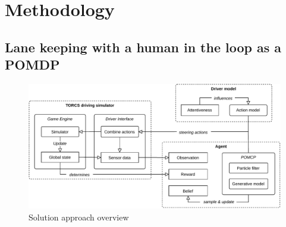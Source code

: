 \chapter{Methodology}
\label{sec:problem}



\section{Lane keeping with a human in the loop as a POMDP}
\label{sec:lane_keeping_loop}

\begin{figure}[ht]
    \centerfloat
    \includegraphics[width=1.2\linewidth]{figures/Components.pdf}
    \caption{Solution approach overview}
    \label{fig:overview}
\end{figure}

